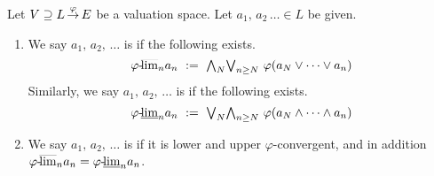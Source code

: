 \documentclass[main.tex]{subfiles}
\begin{document}
\begin{dfn}
\label{D:seq-phi-conv}
Let $V \supseteq L\,\smash{\stackrel{\varphi}{\rightarrow}}\,E$ be a valuation space.
Let $a_1,\, a_2\, \dotsc\in L$ be given.
\begin{enumerate}
\item
We say $a_1,\,a_2,\, \dotsc$
is 
if the following exists.
\begin{equation*}
\pulim\varphi{n}a_n \ \eqdf\ 
\bw_N \bv_{n\geq N}\ \varphi(a_N\vee\dotsb\vee a_n)
\end{equation*}
Similarly,
we say $a_1,\,a_2,\,\dotsc$ is  if
the following exists.
\begin{equation*}
\pllim\varphi{n}a_n \ \eqdf\ 
\bv_N \bw_{n\geq N}\ \varphi(a_N\wedge\dotsb\wedge a_n)
\end{equation*}

\item
We say $a_1,\,a_2,\,\dotsc$
is 
if it is lower and upper $\varphi$-convergent,
and in addition ${\varphi}\text{-}\!\smash{\overline{\lim}_{n}}a_n = {\varphi}\text{-}\!\smash{\underline{\lim}_{n}}a_n$.
\end{enumerate}
\end{dfn}
\end{document}
